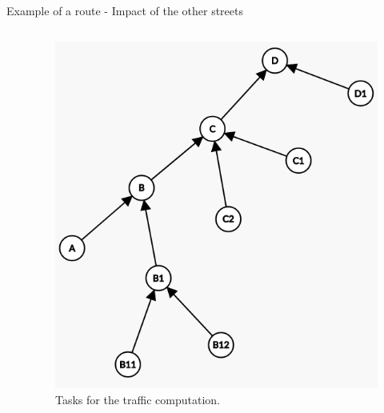 \documentclass[Ligatures=TeX,table,svgnames,usetotalslideindicator,compress,10pt,aspectratio=169]{beamer}
\begin{document}
\begin{frame}{Example of a route - Impact of the other streets}
\begin{columns}
\begin{column}{0.5\textwidth}
\end{column}
\begin{column}{0.5\textwidth}
   \begin{figure}[!h]
        \centering
        \includegraphics[width=.9\textwidth]{images/DAG_2.png}
        \caption{Tasks for the traffic computation.}
      \end{figure}
\end{column}

\end{columns}
\end{frame}

\addtocounter{framenumber}{-1}
\end{document}
